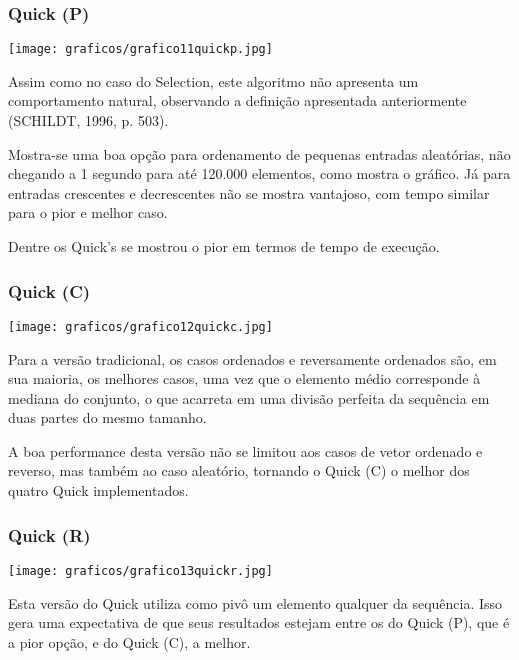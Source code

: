 \documentclass[12pt,a4paper]{article}
\begin{document}
\subsubsection{Quick (P)}
\begin{center}
\texttt{[image: graficos/grafico11quickp.jpg]}
\end{center}

Assim como no caso do Selection, este algoritmo não apresenta um comportamento natural, observando a definição apresentada anteriormente (SCHILDT, 1996, p. 503).

Mostra-se uma boa opção para ordenamento de pequenas entradas aleatórias, não chegando a 1 segundo para até 120.000 elementos, como mostra o gráfico. Já para entradas crescentes e decrescentes não se mostra vantajoso, com tempo similar para o pior e melhor caso. 

Dentre os Quick’s se mostrou o pior em termos de tempo de execução.




\subsubsection{Quick (C)}
\begin{center}
\texttt{[image: graficos/grafico12quickc.jpg]}
\end{center}

Para a versão tradicional, os casos ordenados e reversamente ordenados são, em sua maioria, os melhores casos, uma vez que o elemento médio corresponde à mediana do conjunto, o que acarreta em uma divisão perfeita da sequência em duas partes do mesmo tamanho.

A boa performance desta versão não se limitou aos casos de vetor ordenado e reverso, mas também ao caso aleatório, tornando o Quick (C) o melhor dos quatro Quick implementados.






\subsubsection{Quick (R)}
\begin{center}
\texttt{[image: graficos/grafico13quickr.jpg]}
\end{center}

Esta versão do Quick utiliza como pivô um elemento qualquer da sequência. Isso gera uma expectativa de que seus resultados estejam entre os do Quick (P), que é a pior opção, e do Quick (C), a melhor. 
\end{document}
